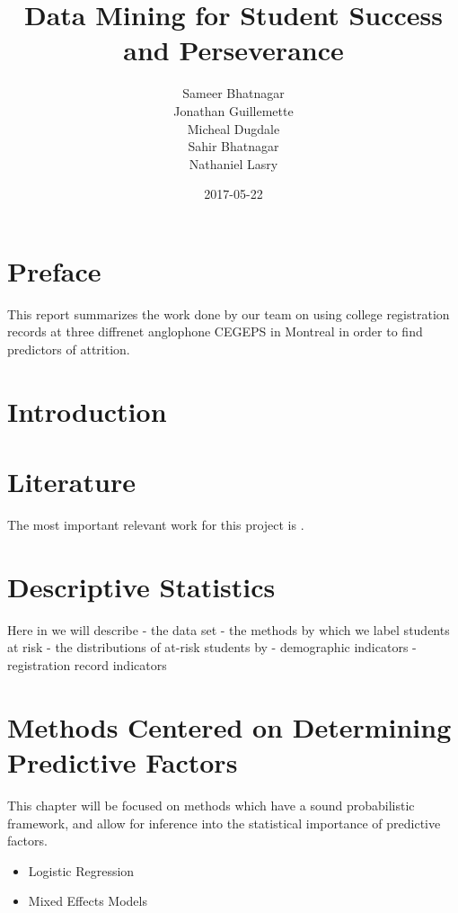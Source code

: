 \documentclass[]{book}
\title{Data Mining for Student Success and Perseverance}
\author{Sameer Bhatnagar \\ Jonathan Guillemette \\ Micheal Dugdale \\ Sahir Bhatnagar \\ Nathaniel Lasry}
\date{2017-05-22}
\providecommand{\tightlist}{%
  \setlength{\itemsep}{0pt}\setlength{\parskip}{0pt}}
\theoremstyle{definition}
\theoremstyle{definition}
\theoremstyle{remark}
\begin{document}
\maketitle

{
\setcounter{tocdepth}{1}
\tableofcontents
}
\chapter{Preface}\label{preface}

This report summarizes the work done by our team on using college
registration records at three diffrenet anglophone CEGEPS in Montreal in
order to find predictors of attrition.

\chapter{Introduction}\label{intro}

\chapter{Literature}\label{literature}

The most important relevant work for this project is
\citep{jorgensen_predicting_2009}.

\chapter{Descriptive Statistics}\label{descriptive-statistics}

Here in we will describe - the data set - the methods by which we label
students at risk - the distributions of at-risk students by -
demographic indicators - registration record indicators

\chapter{Methods Centered on Determining Predictive
Factors}\label{methods-centered-on-determining-predictive-factors}

This chapter will be focused on methods which have a sound probabilistic
framework, and allow for inference into the statistical importance of
predictive factors.

\begin{itemize}
\tightlist
\item
  Logistic Regression
\item
  Mixed Effects Models
\end{itemize}
\end{document}
